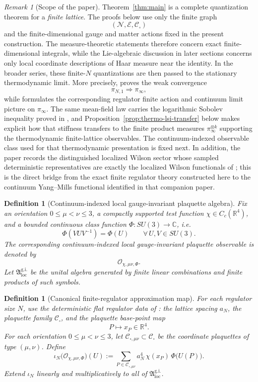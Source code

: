 \documentclass[11pt]{article}
\newtheorem{definition}[theorem]{Definition}
\theoremstyle{remark}
\newtheorem{remark}[theorem]{Remark}
\newcommand{\R}{\mathbb R}
\newcommand{\C}{\mathbb C}
\newcommand{\mcN}{\mathcal N}
\newcommand{\mcE}{\mathcal E}
\begin{document}
\begin{remark}[Scope of the paper]
\label{rem:scope}
Theorem~\ref{thm:main} is a complete quantization theorem for a \emph{finite
lattice}.  The proofs below use only the finite graph
\[
(\mcN,\mcE,\mathcal C_\square)
\]
and the finite-dimensional gauge and matter actions fixed in the present
construction.  The
measure-theoretic statements therefore concern exact finite-dimensional
integrals, while the Lie-algebraic discussion in later sections concerns only
local coordinate descriptions of Haar measure near the identity.  In the
broader series, these finite-$N$ quantizations are then passed to the
stationary thermodynamic limit.  More precisely, \cite{convergence} proves the
weak convergence
\[
\pi_{N,1}\Rightarrow \pi_\infty,
\]
while \cite{continuumqft} formulates the corresponding regulator finite action
and continuum limit picture on $\pi_\infty$.
The same mean-field law carries the logarithmic Sobolev inequality proved in
\cite{convergence}, and Proposition~\ref{prop:thermo-lsi-transfer} below makes
explicit how that stiffness transfers to the finite product measures
$\pi_\infty^{\otimes k}$ supporting the thermodynamic finite-lattice
observables.  The continuum-indexed observable class used for that
thermodynamic presentation is fixed next.  In addition, the paper records the
distinguished localized Wilson sector whose sampled deterministic
representatives are exactly the localized Wilson functionals of
\cite{continuumqft}; this is the direct bridge from the exact finite regulator
theory constructed here to the continuum Yang--Mills functional identified in
that companion paper.
\end{remark}

\begin{definition}[Continuum-indexed local gauge-invariant plaquette algebra]
\label{def:continuum-plaquette-algebra}
Fix an orientation \(0\le \mu<\nu\le 3\), a compactly supported test function
\(\chi\in C_c(\R^4)\), and a bounded continuous class function
\(\Phi:SU(3)\to\C\), i.e.
\[
\Phi(VUV^{-1})=\Phi(U)
\qquad
\forall\,U,V\in SU(3).
\]
The corresponding continuum-indexed local gauge-invariant plaquette observable
is denoted by
\[
\mathcal O_{\chi,\mu\nu,\Phi}.
\]
Let \(\mathfrak A_{\mathrm{loc}}^{\mathrm{g.i.}}\) be the unital algebra
generated by finite linear combinations and finite products of such symbols.
\end{definition}

\begin{definition}[Canonical finite-regulator approximation map]
\label{def:continuum-plaquette-embedding}
For each regulator size \(N\), use the deterministic flat regulator data of
\cite{continuumqft}: the lattice spacing \(a_N\), the plaquette family
\(\mathcal C_\square\), and the plaquette base-point map
\[
P\mapsto x_P\in\R^4.
\]
For each orientation \(0\le\mu<\nu\le3\), let
\(\mathcal C_{\square,\mu\nu}\subset\mathcal C_\square\) be the coordinate
plaquettes of type \((\mu,\nu)\).  Define
\[
\iota_N\bigl(\mathcal O_{\chi,\mu\nu,\Phi}\bigr)(U)
:=
\sum_{P\in\mathcal C_{\square,\mu\nu}}
a_N^4\,\chi(x_P)\,\Phi\bigl(U(P)\bigr).
\]
Extend \(\iota_N\) linearly and multiplicatively to all of
\(\mathfrak A_{\mathrm{loc}}^{\mathrm{g.i.}}\).
\end{definition}
\end{document}
